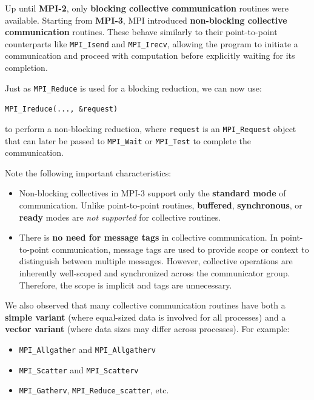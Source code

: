 \documentclass[12pt]{book}
\begin{document}
Up until \textbf{MPI-2}, only \textbf{blocking collective communication} routines were available. Starting from \textbf{MPI-3}, MPI introduced \textbf{non-blocking collective communication} routines. These behave similarly to their point-to-point counterparts like \texttt{MPI\_Isend} and \texttt{MPI\_Irecv}, allowing the program to initiate a communication and proceed with computation before explicitly waiting for its completion.

Just as \texttt{MPI\_Reduce} is used for a blocking reduction, we can now use:
\begin{center}
    \texttt{MPI\_Ireduce(..., \&request)}
\end{center}
to perform a non-blocking reduction, where \texttt{request} is an \texttt{MPI\_Request} object that can later be passed to \texttt{MPI\_Wait} or \texttt{MPI\_Test} to complete the communication.

Note the following important characteristics:
\begin{itemize}
    \item Non-blocking collectives in MPI-3 support only the \textbf{standard mode} of communication. Unlike point-to-point routines, \textbf{buffered}, \textbf{synchronous}, or \textbf{ready} modes are \textit{not supported} for collective routines.
    \item There is \textbf{no need for message tags} in collective communication. In point-to-point communication, message tags are used to provide scope or context to distinguish between multiple messages. However, collective operations are inherently well-scoped and synchronized across the communicator group. Therefore, the scope is implicit and tags are unnecessary.
\end{itemize}

\vspace{1em}

We also observed that many collective communication routines have both a \textbf{simple variant} (where equal-sized data is involved for all processes) and a \textbf{vector variant} (where data sizes may differ across processes). For example:
\begin{itemize}
    \item \texttt{MPI\_Allgather} and \texttt{MPI\_Allgatherv}
    \item \texttt{MPI\_Scatter} and \texttt{MPI\_Scatterv}
    \item \texttt{MPI\_Gatherv}, \texttt{MPI\_Reduce\_scatter}, etc.
\end{itemize}
\end{document}
